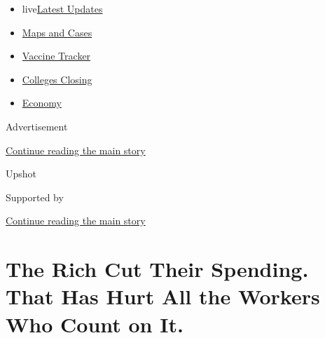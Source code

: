 \begin{itemize}
\tightlist
\item
  live\href{https://www.nytimes3xbfgragh.onion/2020/08/21/world/covid-19-coronavirus.html?name=styln-coronavirus-national\&region=TOP_BANNER\&variant=undefined\&block=storyline_menu_recirc\&action=click\&pgtype=Article\&impression_id=a65495b0-e3ad-11ea-85cc-bf105b368d22}{Latest
  Updates}
\item
  \href{https://www.nytimes3xbfgragh.onion/interactive/2020/us/coronavirus-us-cases.html?name=styln-coronavirus-national\&region=TOP_BANNER\&variant=undefined\&block=storyline_menu_recirc\&action=click\&pgtype=Article\&impression_id=a65495b1-e3ad-11ea-85cc-bf105b368d22}{Maps
  and Cases}
\item
  \href{https://www.nytimes3xbfgragh.onion/interactive/2020/science/coronavirus-vaccine-tracker.html?name=styln-coronavirus-national\&region=TOP_BANNER\&variant=undefined\&block=storyline_menu_recirc\&action=click\&pgtype=Article\&impression_id=a654bcc0-e3ad-11ea-85cc-bf105b368d22}{Vaccine
  Tracker}
\item
  \href{https://www.nytimes3xbfgragh.onion/2020/08/19/us/colleges-closing-covid.html?name=styln-coronavirus-national\&region=TOP_BANNER\&variant=undefined\&block=storyline_menu_recirc\&action=click\&pgtype=Article\&impression_id=a654bcc1-e3ad-11ea-85cc-bf105b368d22}{Colleges
  Closing}
\item
  \href{https://www.nytimes3xbfgragh.onion/live/2020/08/21/business/stock-market-today-coronavirus?name=styln-coronavirus-national\&region=TOP_BANNER\&variant=undefined\&block=storyline_menu_recirc\&action=click\&pgtype=Article\&impression_id=a654bcc2-e3ad-11ea-85cc-bf105b368d22}{Economy}
\end{itemize}

Advertisement

\protect\hyperlink{after-top}{Continue reading the main story}

Upshot

Supported by

\protect\hyperlink{after-sponsor}{Continue reading the main story}

\hypertarget{the-rich-cut-their-spending-that-has-hurt-all-the-workers-who-count-on-it}{%
\section{The Rich Cut Their Spending. That Has Hurt All the Workers Who
Count on
It.}\label{the-rich-cut-their-spending-that-has-hurt-all-the-workers-who-count-on-it}}

